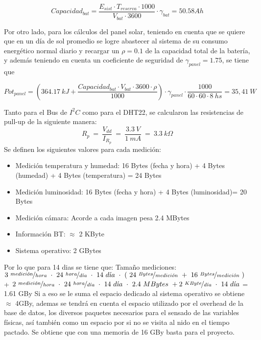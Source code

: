 \begin{equation}
Capacidad_{bat} = \frac{E_{sist}\cdot T_{reserva}\cdot 1000}{V_{bat}\cdot 3600}\cdot \gamma_{bat} = 50.58Ah
\end{equation}

Por otro lado, para los cálculos del panel solar, teniendo en cuenta que se quiere que en un día de sol promedio se logre abastecer al sistema de su consumo energético normal diario y recargar un $\rho = 0.1$ de la capacidad total de la batería, y además teniendo en cuenta un coeficiente de seguridad de $\gamma_{panel} = 1.75$, se tiene que

\begin{equation}
Pot_{panel} = \left( 364.17 \ kJ + \frac{Capacidad_{bat}\cdot V_{bat}\cdot 3600\cdot \rho}{1000}\right)\cdot \gamma_{panel} \cdot  \frac{1000}{60\cdot 60\cdot 8 \ hs} = 35,41 \ W
\end{equation}


Tanto para el Bus de $I^2C$ como para el DHT22, se calcularon las resistencias de pull-up de la siguiente manera:
\begin{equation}
	R_p \ = \  \frac{V_{dd}}{I_{R_p}} \ = \ \frac{3.3 \ V}{1 \ mA} \ = \ 3.3 \ k\Omega  
\end{equation}
Se definen los siguientes valores para cada medici\'on:
\begin{itemize}
\item Medici\'on temperatura y humedad: 16 Bytes (fecha y hora) + 4 Bytes (humedad) + 4 Bytes (temperatura) = 24 Bytes
\item Medici\'on luminosidad: 16 Bytes (fecha y hora) + 4 Bytes (luminosidad)= 20 Bytes
\item Medici\'on c\'amara: Acorde a \cite{ref:rpicam} cada imagen pesa 2.4 MBytes
\item Informaci\'on BT: $\approx$ 2 KByte
\item Sistema operativo: 2 GBytes
\end{itemize}
Por lo que para 14 dias se tiene que:
Tamaño mediciones: $3 \ \nicefrac{medici\acute{o}n}{hora} \  \cdot \ 24 \ \nicefrac{hora}{d\acute{\imath}a} \  \cdot \ 14 \ d\acute{\imath}a \  \cdot \ ( \ 24 \  \nicefrac{Bytes}{medici\acute{o}n} \  + \ 16 \ \nicefrac{Bytes}{medici\acute{o}n} \ ) $ + $2 \ \nicefrac{medici\acute{o}n}{hora} \  \cdot \ 24 \ \nicefrac{hora}{d\acute{\imath}a} \  \cdot \ 14 \ d\acute{\imath}a \  \cdot \  2.4 \ MBytes \ + 2 \ \nicefrac{KByte}{d\acute{\imath}a} \  \cdot \  14 \ d\acute{\imath}a $ = 1.61 GBy 
Si a eso se le suma el espacio dedicado al sistema operativo se obtiene $\approx$ 4GBy, ademas se tendr\'a en cuenta el espacio utilizado por el overhead de la base de datos, los diversos paquetes necesarios para el sensado de las variables f\'isicas, as\'i tambi\'en como un espacio por si no se visita al nido en el tiempo pactado. Se obtiene que con una memoria de 16 GBy basta para el proyecto.
